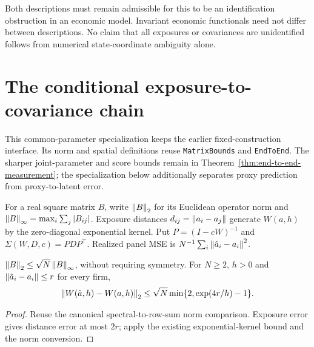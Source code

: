 Both descriptions must remain admissible for this to be an identification
obstruction in an economic model. Invariant economic functionals need not differ
between descriptions. No claim that all exposures or covariances are
unidentified
follows from numerical state-coordinate ambiguity alone.

\section{The conditional exposure-to-covariance chain}\label{sec:bp-pipeline}

This common-parameter specialization keeps the earlier
fixed-construction interface.
Its norm and spatial definitions reuse \texttt{MatrixBounds} and
\texttt{EndToEnd}. The sharper joint-parameter and score bounds remain in
Theorem~\ref{thm:end-to-end-measurement}; the specialization below additionally
separates proxy prediction from proxy-to-latent error.

\begin{definition}\label{def:pipeline}
  \leanok
  For a real square matrix $B$, write $\left\lVert B\right\rVert_2$ for its Euclidean operator
  norm and $\left\lVert B\right\rVert_\infty=\max_i\sum_j\left\lvert B_{ij}\right\rvert$.
  Exposure distances $d_{ij}=\left\lVert a_i-a_j\right\rVert$ generate $W(a,h)$ by the
  zero-diagonal exponential kernel. Put $P=(I-cW)^{-1}$ and
  $\Sigma(W,D,c)=PDP^\top$. Realized panel MSE is
  $N^{-1}\sum_i\left\lVert\hat a_i-a_i\right\rVert^2$.
\end{definition}

\begin{lemma}\label{thm:pipeline-norm}
  \leanok
  $\left\lVert B\right\rVert_2\le\sqrt N\left\lVert B\right\rVert_\infty$, without requiring symmetry.
  For $N\ge2$, $h>0$ and $\left\lVert\hat a_i-a_i\right\rVert\le r$ for every firm,
  \[
    \left\lVert W(\hat a,h)-W(a,h)\right\rVert_2
    \le\sqrt N\min\{2,\exp(4r/h)-1\}.
  \]
\end{lemma}
\begin{proof}\leanok
  Reuse the canonical spectral-to-row-sum norm comparison. Exposure error
  gives distance error at most $2r$; apply the existing exponential-kernel
  bound and the norm conversion.
\end{proof}


